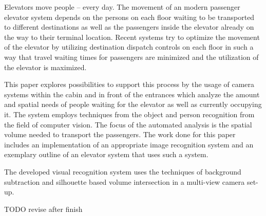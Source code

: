 \hspace{2cm}

Elevators move people -- every day.
The movement of an modern passenger elevator system depends on the persons on
each floor waiting to be transported to different destinations as well as the
passengers inside the elevator already on the way to their terminal location.
Recent systems try to optimize the movement of the elevator by utilizing
destination dispatch controls on each floor in such a way that travel
waiting times for passengers are minimized and the utilization of the elevator
is maximized.

This paper explores possibilities to support this process by the usage of
camera systems within the cabin and in front of the entrances which analyze
the amount and spatial needs of people waiting for the elevator as well as
currently occupying it.
The system employs techniques from the object and person recognition
from the field of computer vision.
The focus of the automated analysis is the spatial volume needed to
transport the passengers.
The work done for this paper includes an implementation of an appropriate
image recognition system and an exemplary outline of an elevator system
that uses such a system.

The developed visual recognition system uses the techniques of background subtraction and silhouette based volume intersection in a multi-view camera set-up.

TODO revise after finish
